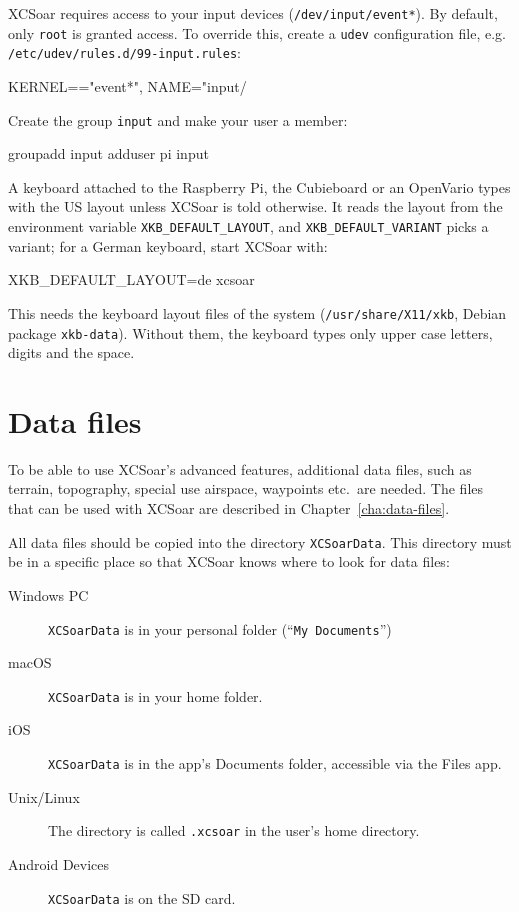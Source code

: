 XCSoar requires access to your input devices
(\texttt{/dev/input/event*}).  By default, only \texttt{root} is
granted access.  To override this, create a \texttt{udev}
configuration file, e.g. \texttt{/etc/udev/rules.d/99-input.rules}:

\begin{verbatim*}
KERNEL=="event*", NAME="input/%
\end{verbatim*}

Create the group \texttt{input} and make your user a member:

\begin{verbatim*}
groupadd input
adduser pi input
\end{verbatim*}

A keyboard attached to the Raspberry Pi, the Cubieboard or an OpenVario
types with the US layout unless XCSoar is told otherwise.  It reads the
layout from the environment variable \texttt{XKB\_DEFAULT\_LAYOUT}, and
\texttt{XKB\_DEFAULT\_VARIANT} picks a variant; for a German keyboard,
start XCSoar with:

\begin{verbatim*}
XKB_DEFAULT_LAYOUT=de xcsoar
\end{verbatim*}

This needs the keyboard layout files of the system
(\texttt{/usr/share/X11/xkb}, Debian package \texttt{xkb-data}).
Without them, the keyboard types only upper case letters, digits and
the space.

\section{Data files}\label{sec:data files}

To be able to use XCSoar's advanced features, additional data files, such as
terrain, topography, special use airspace, waypoints etc.\ are needed. The files
that can be used with XCSoar are described in Chapter~\ref{cha:data-files}.

All data files should be copied into the directory
\texttt{XCSoarData}.  This directory must be in a specific place
so that XCSoar knows where to look for data files:

\begin{description}
\item[Windows PC]
\texttt{XCSoarData} is in your personal folder (``\texttt{My
Documents}'')
\item[macOS]
\texttt{XCSoarData} is in your home folder.
\item[iOS]
\texttt{XCSoarData} is in the app's Documents folder, accessible via
the Files app.
\item[Unix/Linux]
The directory is called \verb|.xcsoar| in the user's home directory.
\item[Android Devices]
\texttt{XCSoarData} is on the SD card.
\end{description}



